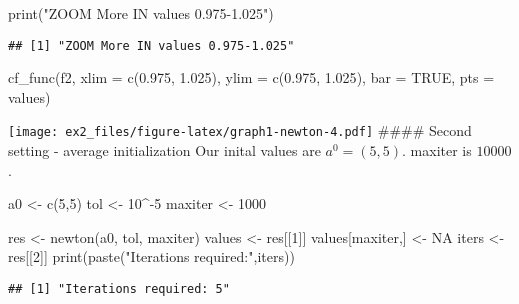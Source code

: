 \documentclass[
]{article}
\newenvironment{Shaded}{\begin{snugshade}}{\end{snugshade}}
\newcommand{\AttributeTok}[1]{\textcolor[rgb]{0.77,0.63,0.00}{#1}}
\newcommand{\ConstantTok}[1]{\textcolor[rgb]{0.00,0.00,0.00}{#1}}
\newcommand{\DecValTok}[1]{\textcolor[rgb]{0.00,0.00,0.81}{#1}}
\newcommand{\FloatTok}[1]{\textcolor[rgb]{0.00,0.00,0.81}{#1}}
\newcommand{\FunctionTok}[1]{\textcolor[rgb]{0.00,0.00,0.00}{#1}}
\newcommand{\NormalTok}[1]{#1}
\newcommand{\OtherTok}[1]{\textcolor[rgb]{0.56,0.35,0.01}{#1}}
\newcommand{\SpecialCharTok}[1]{\textcolor[rgb]{0.00,0.00,0.00}{#1}}
\newcommand{\StringTok}[1]{\textcolor[rgb]{0.31,0.60,0.02}{#1}}
\begin{document}
\begin{Shaded}
\begin{Highlighting}[]
\FunctionTok{print}\NormalTok{(}\StringTok{"ZOOM More IN values 0.975{-}1.025"}\NormalTok{)}
\end{Highlighting}
\end{Shaded}

\begin{verbatim}
## [1] "ZOOM More IN values 0.975-1.025"
\end{verbatim}

\begin{Shaded}
\begin{Highlighting}[]
\FunctionTok{cf\_func}\NormalTok{(f2, }\AttributeTok{xlim =} \FunctionTok{c}\NormalTok{(}\FloatTok{0.975}\NormalTok{, }\FloatTok{1.025}\NormalTok{), }\AttributeTok{ylim =} \FunctionTok{c}\NormalTok{(}\FloatTok{0.975}\NormalTok{, }\FloatTok{1.025}\NormalTok{), }\AttributeTok{bar =} \ConstantTok{TRUE}\NormalTok{, }\AttributeTok{pts =}\NormalTok{ values)}
\end{Highlighting}
\end{Shaded}

\texttt{[image: ex2\_files/figure-latex/graph1-newton-4.pdf]} \#\#\#\#
Second setting - average initialization Our inital values are
\(a^{0}=(5, 5)\). maxiter is \(10000\).

\begin{Shaded}
\begin{Highlighting}[]
\NormalTok{a0 }\OtherTok{\textless{}{-}} \FunctionTok{c}\NormalTok{(}\DecValTok{5}\NormalTok{,}\DecValTok{5}\NormalTok{)}
\NormalTok{tol }\OtherTok{\textless{}{-}} \DecValTok{10}\SpecialCharTok{\^{}{-}}\DecValTok{5}
\NormalTok{maxiter }\OtherTok{\textless{}{-}} \DecValTok{1000}

\NormalTok{res }\OtherTok{\textless{}{-}} \FunctionTok{newton}\NormalTok{(a0, tol, maxiter)}
\NormalTok{values }\OtherTok{\textless{}{-}}\NormalTok{ res[[}\DecValTok{1}\NormalTok{]]}
\NormalTok{values[maxiter,] }\OtherTok{\textless{}{-}} \ConstantTok{NA}
\NormalTok{iters }\OtherTok{\textless{}{-}}\NormalTok{ res[[}\DecValTok{2}\NormalTok{]]}
\FunctionTok{print}\NormalTok{(}\FunctionTok{paste}\NormalTok{(}\StringTok{"Iterations required:"}\NormalTok{,iters))}
\end{Highlighting}
\end{Shaded}

\begin{verbatim}
## [1] "Iterations required: 5"
\end{verbatim}
\end{document}
